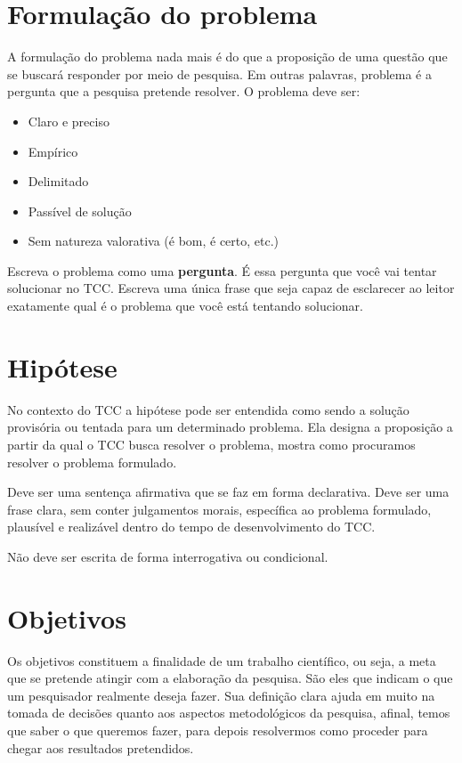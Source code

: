 \section{Formulação do problema}
\label{sec:intro:form_prob}

A formulação do problema nada mais é do que a proposição de uma questão que se
buscará responder por meio de pesquisa. Em outras palavras, problema é a
pergunta que a pesquisa pretende resolver. O problema deve ser:

\begin{itemize}
\item Claro e preciso
\item Empírico
\item Delimitado
\item Passível de solução
\item Sem natureza valorativa (é bom, é certo, etc.)
\end{itemize}

Escreva o problema como uma \textbf{pergunta}. É essa pergunta que você vai
tentar solucionar no TCC. Escreva uma única frase que seja capaz de esclarecer
ao leitor exatamente qual é o problema que você está tentando solucionar.


\section{Hipótese}
\label{sec:intro:hip}

No contexto do TCC a hipótese pode ser entendida como sendo a solução provisória
ou tentada para um determinado problema. Ela designa a proposição a partir da
qual o TCC busca resolver o problema, mostra como procuramos resolver o problema
formulado.

Deve ser uma sentença afirmativa que se faz em forma declarativa. Deve ser uma
frase clara, sem conter julgamentos morais, específica ao problema formulado,
plausível e realizável dentro do tempo de desenvolvimento do TCC.

Não deve ser escrita de forma interrogativa ou condicional.


\section{Objetivos}
\label{sec:intro:obj}

Os objetivos constituem a finalidade de um trabalho científico, ou seja, a meta
que se pretende atingir com a elaboração da pesquisa. São eles que indicam o que
um pesquisador realmente deseja fazer. Sua definição clara ajuda em muito na
tomada de decisões quanto aos aspectos metodológicos da pesquisa, afinal, temos
que saber o que queremos fazer, para depois resolvermos como proceder para
chegar aos resultados pretendidos.


